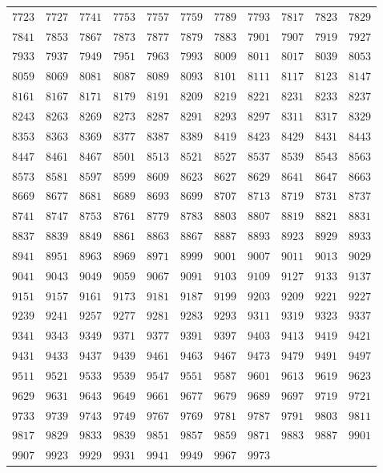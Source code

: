 \begin{table}[h!]
{\begin{tabular}{|c|c|c|c|c|c|c|c|c|c|c|}
$7723$ & $7727$ & $7741$ & $7753$ & $7757$ & $7759$ & $7789$ & $7793$ & $7817$ & $7823$ & $7829$ \\
$7841$ & $7853$ & $7867$ & $7873$ & $7877$ & $7879$ & $7883$ & $7901$ & $7907$ & $7919$ & $7927$ \\
$7933$ & $7937$ & $7949$ & $7951$ & $7963$ & $7993$ & $8009$ & $8011$ & $8017$ & $8039$ & $8053$ \\
$8059$ & $8069$ & $8081$ & $8087$ & $8089$ & $8093$ & $8101$ & $8111$ & $8117$ & $8123$ & $8147$ \\
$8161$ & $8167$ & $8171$ & $8179$ & $8191$ & $8209$ & $8219$ & $8221$ & $8231$ & $8233$ & $8237$ \\
$8243$ & $8263$ & $8269$ & $8273$ & $8287$ & $8291$ & $8293$ & $8297$ & $8311$ & $8317$ & $8329$ \\
$8353$ & $8363$ & $8369$ & $8377$ & $8387$ & $8389$ & $8419$ & $8423$ & $8429$ & $8431$ & $8443$ \\
$8447$ & $8461$ & $8467$ & $8501$ & $8513$ & $8521$ & $8527$ & $8537$ & $8539$ & $8543$ & $8563$ \\
$8573$ & $8581$ & $8597$ & $8599$ & $8609$ & $8623$ & $8627$ & $8629$ & $8641$ & $8647$ & $8663$ \\
$8669$ & $8677$ & $8681$ & $8689$ & $8693$ & $8699$ & $8707$ & $8713$ & $8719$ & $8731$ & $8737$ \\
$8741$ & $8747$ & $8753$ & $8761$ & $8779$ & $8783$ & $8803$ & $8807$ & $8819$ & $8821$ & $8831$ \\
$8837$ & $8839$ & $8849$ & $8861$ & $8863$ & $8867$ & $8887$ & $8893$ & $8923$ & $8929$ & $8933$ \\
$8941$ & $8951$ & $8963$ & $8969$ & $8971$ & $8999$ & $9001$ & $9007$ & $9011$ & $9013$ & $9029$ \\
$9041$ & $9043$ & $9049$ & $9059$ & $9067$ & $9091$ & $9103$ & $9109$ & $9127$ & $9133$ & $9137$ \\
$9151$ & $9157$ & $9161$ & $9173$ & $9181$ & $9187$ & $9199$ & $9203$ & $9209$ & $9221$ & $9227$ \\
$9239$ & $9241$ & $9257$ & $9277$ & $9281$ & $9283$ & $9293$ & $9311$ & $9319$ & $9323$ & $9337$ \\
$9341$ & $9343$ & $9349$ & $9371$ & $9377$ & $9391$ & $9397$ & $9403$ & $9413$ & $9419$ & $9421$ \\
$9431$ & $9433$ & $9437$ & $9439$ & $9461$ & $9463$ & $9467$ & $9473$ & $9479$ & $9491$ & $9497$ \\
$9511$ & $9521$ & $9533$ & $9539$ & $9547$ & $9551$ & $9587$ & $9601$ & $9613$ & $9619$ & $9623$ \\
$9629$ & $9631$ & $9643$ & $9649$ & $9661$ & $9677$ & $9679$ & $9689$ & $9697$ & $9719$ & $9721$ \\
$9733$ & $9739$ & $9743$ & $9749$ & $9767$ & $9769$ & $9781$ & $9787$ & $9791$ & $9803$ & $9811$ \\
$9817$ & $9829$ & $9833$ & $9839$ & $9851$ & $9857$ & $9859$ & $9871$ & $9883$ & $9887$ & $9901$ \\
$9907$ & $9923$ & $9929$ & $9931$ & $9941$ & $9949$ & $9967$ & $9973$ &        &        &       \\
\hline


\end{tabular}}
\end{table}
